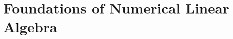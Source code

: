 \documentclass[../main.tex]{subfiles}
\begin{document}
\part{Foundations of Numerical Linear Algebra}\label{part:foundations}




\end{document}
